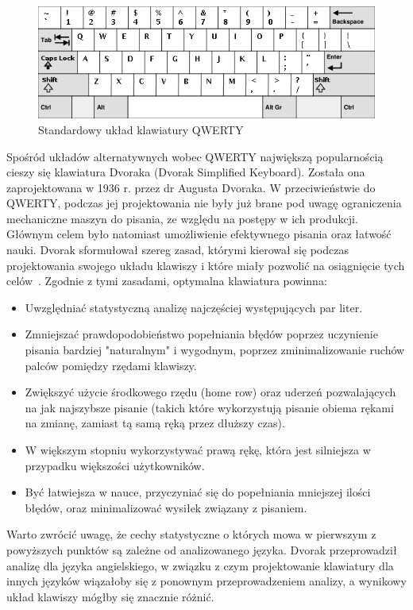 \documentclass{xmgr}
\begin{document}
\begin{figure}[!tbh]
\centering
\includegraphics[width=.8\hsize]{fig/qwerty}
\caption{Standardowy układ klawiatury QWERTY}
\end{figure}

Spośród układów alternatywnych wobec QWERTY największą popularnością cieszy się klawiatura Dvoraka (Dvorak Simplified Keyboard). Została ona zaprojektowana w 1936 r. przez dr Augusta Dvoraka. W przeciwieństwie do QWERTY, podczas jej projektowania nie były już brane pod uwagę ograniczenia mechaniczne maszyn do pisania, ze względu na postępy w ich produkcji. Głównym celem było natomiast umożliwienie efektywnego pisania oraz łatwość nauki. Dvorak sformułował szereg zasad, którymi kierował się podczas projektowania swojego układu klawiszy i które miały pozwolić na osiągnięcie tych celów~\cite{cassingham1986dvorak}. Zgodnie z tymi zasadami, optymalna klawiatura powinna:
\begin{itemize}
\item Uwzględniać statystyczną analizę najczęściej występujących par liter.
\item Zmniejszać prawdopodobieństwo popełniania błędów poprzez uczynienie pisania bardziej "naturalnym" i wygodnym, poprzez zminimalizowanie ruchów palców pomiędzy rzędami klawiszy.
\item Zwiększyć użycie środkowego rzędu (home row) oraz uderzeń pozwalających na jak najszybsze pisanie (takich które wykorzystują pisanie obiema rękami na zmianę, zamiast tą samą ręką przez dłuższy czas).
\item W większym stopniu wykorzystywać prawą rękę, która jest silniejsza w przypadku większości użytkowników.
\item Być łatwiejsza w nauce, przyczyniać się do popełniania mniejszej ilości błędów, oraz minimalizować wysiłek związany z pisaniem.
\end{itemize}
Warto zwrócić uwagę, że cechy statystyczne o których mowa w pierwszym z powyższych punktów są zależne od analizowanego języka. Dvorak przeprowadził analizę dla języka angielskiego, w związku z czym projektowanie klawiatury dla innych języków wiązałoby się z ponownym przeprowadzeniem analizy, a wynikowy układ klawiszy mógłby się znacznie różnić.
\end{document}
